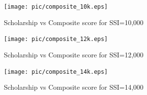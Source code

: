 \documentclass[12pt,english]{report}
\begin{document}

\begin{figure} [!htbp]
\texttt{[image: pic/composite\_10k.eps]}
\caption{Scholarship vs Composite score for SSI=10,000} \label{allocation_results_g}
\end{figure}

\begin{figure} [!htbp]
\texttt{[image: pic/composite\_12k.eps]}
\caption{Scholarship vs Composite score for SSI=12,000} \label{allocation_results_h}
\end{figure}


\begin{figure} [!htbp]
\texttt{[image: pic/composite\_14k.eps]}
\caption{Scholarship vs Composite score for SSI=14,000} \label{allocation_results_i}
\end{figure}
\end{document}
